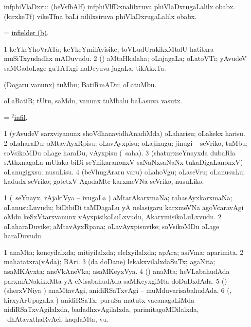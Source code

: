 \bentry
{}
\gl{\nA}
\bmng
infphiVlaDxru: 
\banum
{} (beVsfbAlf) infphiVlfDxnalilxruva phiVlaDxrugaLalilx obabx. 
\hypertarget{infielder(b)}{} 
 (kirxkeTf) vikeTfna baLi nililxsiruva phiVlaDxrugaLalilx obabx. 
\eanum
\emng
\eentry

\bentry
{}
\gl{\nA}
\bmng
 = \hyperlink{infielder(b)}{infielder (b)}. 
\emng
\eentry

\bentry
{}
\gl{\nA}
\bmng
\bnum
\num{1} keYkeYhoVrATa; keYkeYmilAyisike; toVLudUrakikxMtalU hatitxra muSiTxyudadhx mADuvudu. 
\num{2} (\rUpa) aMtaHkalaha; oLajagaLa; oLatoVTi; yAvudeV saMGadoLage guTATxgi naDeyuva jagaLa, tikAkxTa. 
\enum
\emng
\eentry

\bentry
{}
\gl{\sakirx}
\bmng
(Dogaru \mo vanunx) tuMbu; BatiRmADu; oLatuMbu. 
\emng
\eentry

\bentry
{}
\gl{\nA}
\bmng
oLaBatiR; tUtu, saMdu, \mo vanunx tuMbalu baLasuva vasutx. 
\emng
\eentry

\bentry
{}
\gl{\nA}
\bmng
 = \hyperlink{infill(2)}{$^2$infil}. 
\emng
\eentry

\bentry
{}
\gl{\sakirx}
\bmng
\bnum
\num{1} (yAvudeV sarxviyanunx shoVdhanavidhAnadiMda) oLaharisu; oLakekx harisu. 
\num{2} oLaharaDu; aMtavAyxRpisu; oLavAyxpisu; oLajinugu; jinugi -- seVriko, tuMbu; soVsikoMDu oLage haraDu, vAyxpisu (\akirx\ saha). 
\num{3} (shaturxseYnayxda dubaRla sAthxnagaLa mUlaka biDi seYnikaranonxV saNaNxsaNaNx tukaDigaLanonxV) oLanugigxsu; nusuLisu. 
\num{4} (beVhugAraru \mo varu) oLahoVgu; oLaseVru; oLanusuLu; kadudx seVriko; gotetxV AgadaMte karxmeVNa seVriko, nusuLiko. 
\enum
\emng
\eentry

\bentry
{}
\gl{\nA}
\bmng
\bnum
\num{1} (\kanmu\ seYnayx, rAjakiVya -- ivugaLa \vi) aMtarAkarxmaNa; rahasAyxkarxmaNa; oLanusuLuvudu; biDibiDi taMDagaLu yA nelasigaru karxmeVNa agoVcaravAgi oMdu keSxVtarxvanunx vAyxpisikoLuLxvudu, AkarxmisikoLuLxvudu. 
\num{2} oLaharaDuvike; aMtavAyxRpana; oLavAyxpisuvike; soVsikoMDu oLage haraDuvudu. 
\enum
\emng
\eentry

\bentry
{}
\gl{\gu}
\bmng
\bnum
\num{1} anaMta; koneyilalxda; mitiyilalxda; elelxyilalxda; apAra; asiVma; aparimita. 
\num{2} mahatatxra(vAda); BAri. 
\num{3} (\bava da \nA doDane) lekakxvilalxdaSuTx; agaNita; asaMKAyxta; aneVkAneVka; asaMKeyxVya. 
\num{4} (\ga) anaMta; heVLabahudAda parxmANakikxMta yA eNisabahudAda saMKeyxgiMta doDaDxdAda. 
\num{5} (\ga) (sherxVNiya \vi) anaMtavAgi, anidiRSaTxvAgi -- muMduvarisabahudAda. 
\num{6} (\vAyx, kirxyArUpagaLa \vi) anidiRSaTx; puruSa matutx vacanagaLiMda nidiRSaTxvAgilalxda, badadhxvAgilalxda, parimitagoMDilalxda, \udA\ dhAtavxthaRvAci, kaqdaMta, \mo vu. 
\enum
\emng
\eentry

